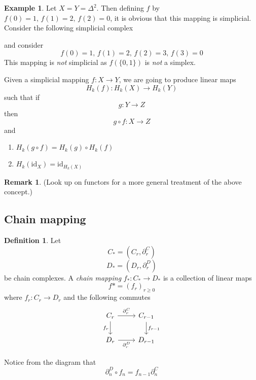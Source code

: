 \documentclass[a4paper,14pt]{extarticle}
\theoremstyle{definition}
\newtheorem*{definition}{Definition}
\newtheorem*{eg}{Example}
\newtheorem*{remark}{Remark}
\begin{document}
\begin{eg}
	Let $X=Y=\Delta^2$. Then defining $f$ by $f(0)=1,\,f(1)=2, \,f(2)=0$, it is obvious that this mapping is simplicial. \\

	Consider the following simplicial complex
	\begin{center}
	\end{center}
	and consider \[f(0)=1,\,f(1)=2,\,f(2)=3,\,f(3)=0\] This mapping is \emph{not} simplicial as $f(\{0,1\})$ is \emph{not} a simplex.
\end{eg}

Given a simplicial mapping $f:X\rightarrow Y$, we are going to produce linear maps \[H_k(f):H_k(X)\rightarrow H_k(Y)\] such that if \[g:Y\rightarrow Z\] then \[g\circ f:X\rightarrow Z\] and
\begin{enumerate}
	\item $H_k(g\circ f)=H_k(g)\circ H_k(f)$
	\item $H_k(\text{id}_X)=\text{id}_{H_k(X)}$
\end{enumerate}

\begin{remark}
	(Look up on functors for a more general treatment
	of the above concept.)
\end{remark}

\subsection{Chain mapping}
\begin{definition}
	Let \[C_*=(C_r,\partial_r^C)\]\[D_*=(D_r,\partial_r^D)\] be chain complexes. A \emph{chain mapping} $f_*:C_*\rightarrow D_*$ is a collection of linear maps \[f*=(f_r)_{r\geq0}\] where
	$f_r:C_r\rightarrow D_r$ and the following commutes
	\[
	\begin{tikzcd}
	C_r \arrow{r}{\partial_r^C} \arrow[swap]{d}{f_r} & C_{r-1} \arrow{d}{f_{r-1}} \\
	D_r\arrow[swap]{r}{\partial_r^D} & D_{r-1}
	\end{tikzcd}
	\]	
\end{definition}

Notice from the diagram that \[\partial_n^D\circ f_n=f_{n-1}\partial_n^C\]
\end{document}
